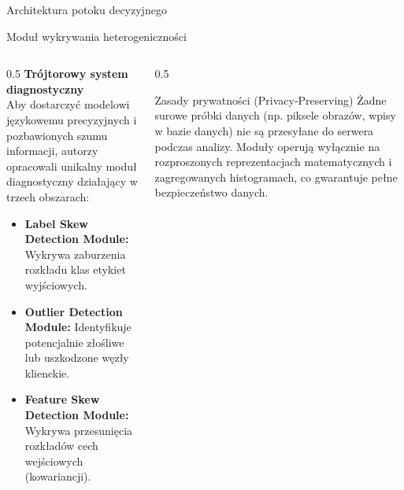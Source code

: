 \documentclass[9pt,aspectratio=169]{beamer}
\begin{document}
\begin{frame}{Architektura potoku decyzyjnego}
\centering
{}
\end{frame}

\begin{frame}{Moduł wykrywania heterogeniczności}
\begin{columns}[T]
\begin{column}{0.5\textwidth}
\textbf{Trójtorowy system diagnostyczny}\\[4pt]
Aby dostarczyć modelowi językowemu precyzyjnych i pozbawionych szumu informacji, autorzy opracowali unikalny moduł diagnostyczny działający w trzech obszarach:
\begin{itemize}\footnotesize
\item \textbf{Label Skew Detection Module:} Wykrywa zaburzenia rozkładu klas etykiet wyjściowych.
\item \textbf{Outlier Detection Module:} Identyfikuje potencjalnie złośliwe lub uszkodzone węzły klienckie.
\item \textbf{Feature Skew Detection Module:} Wykrywa przesunięcia rozkładów cech wejściowych (kowariancji).
\end{itemize}
\end{column}
\begin{column}{0.5\textwidth}
\begin{infoboxgreen}{Zasady prywatności (Privacy-Preserving)}
Żadne surowe próbki danych (np. piksele obrazów, wpisy w bazie danych) nie są przesyłane do serwera podczas analizy. Moduły operują wyłącznie na rozproszonych reprezentacjach matematycznych i zagregowanych histogramach, co gwarantuje pełne bezpieczeństwo danych.
\end{infoboxgreen}
\end{column}
\end{columns}
\end{frame}
\end{document}
